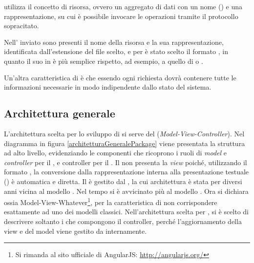  utilizza il concetto di risorsa, ovvero un aggregato di dati con un nome () e una rappresentazione, su cui è possibile invocare le operazioni  tramite il protocollo sopracitato.

Nell' inviato sono presenti il nome della risorsa e la sua rappresentazione, identificata dall'estensione del file scelto, e per \ProjectName{} è stato scelto il formato , in quanto il suo  in  è più semplice rispetto, ad esempio, a quello di  o .

Un'altra caratteristica di  è che essendo  ogni richiesta dovrà contenere tutte le informazioni necessarie in modo indipendente dallo stato del sistema.

\subsection{Architettura generale}

L'architettura scelta per lo sviluppo di \ProjectName{} si serve del   (\textit{Model-View-Controller}). Nel diagramma in figura \ref{architetturaGeneralePackage} viene presentata la struttura ad alto livello, evidenziando le componenti che ricoprono i ruoli di \textit{model} e \textit{controller} per il , e controller per il . Il  non presenta la \textit{view} poiché, utilizzando il formato , la conversione dalla rappresentazione interna alla presentazione testuale () è automatica e diretta.
Il  è gestito dal  , la cui architettura è stata per diversi anni vicina al modello . Nel tempo si è avvicinato più al modello . Ora  si dichiara  ossia Model-View-Whatever\footnote{Si rimanda al sito ufficiale di AngularJS: \url{http://angularjs.org/}}, per la caratteristica di non corrispondere esattamente ad uno dei modelli classici. Nell'architettura scelta per \ProjectName{}, si è scelto di descrivere soltanto i  che compongono il controller, perché l'aggiornamento della view e del model viene gestito da  internamente.

